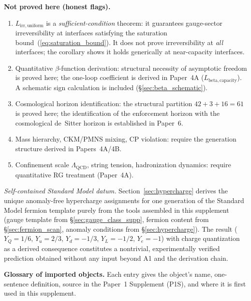 \documentclass[11pt,a4paper]{article}
\theoremstyle{definition}
\begin{document}
\begin{tcolorbox}[apfbox, title={What Is Assumed, What Is Proved, What Is Deferred}]
\smallskip\noindent\textbf{Not proved here (honest flags).}
\begin{enumerate}[nosep,label=\arabic*.,leftmargin=2em]
  \item $L_{\mathrm{irr,uniform}}$ is a \emph{sufficient-condition} theorem: it guarantees gauge-sector irreversibility at interfaces satisfying the saturation bound~(\ref{eq:saturation_bound}).  It does not prove irreversibility at \emph{all} interfaces; the corollary shows it holds generically at near-capacity interfaces.
  \item Quantitative $\beta$-function derivation: structural necessity of asymptotic freedom is proved here; the one-loop coefficient is derived in Paper~4A ($L_{\mathrm{beta,capacity}}$).  A schematic sign calculation is included (\S\ref{sec:beta_schematic}).
  \item Cosmological horizon identification: the structural partition $42+3+16=61$ is proved here; the identification of the enforcement horizon with the cosmological de~Sitter horizon is established in Paper~6.
  \item Mass hierarchy, CKM/PMNS mixing, CP violation: require the generation structure derived in Papers~4A/4B.
  \item Confinement scale $\Lambda_{\mathrm{QCD}}$, string tension, hadronization dynamics: require quantitative RG treatment (Paper~4A).
\end{enumerate}
\end{tcolorbox}

\smallskip\noindent\textit{Self-contained Standard Model datum.}\quad
Section~\ref{sec:hypercharge} derives the unique anomaly-free hypercharge
assignments for one generation of the Standard Model fermion template
purely from the tools assembled in this supplement (gauge template from
\S\ref{sec:gauge_class_supp}, fermion content from \S\ref{sec:fermion_scan},
anomaly conditions from \S\ref{sec:hypercharge}).  The result
($Y_Q = 1/6$, $Y_u = 2/3$, $Y_d = -1/3$, $Y_L = -1/2$, $Y_e = -1$)
with charge quantization as a derived consequence constitutes a
nontrivial, experimentally verified prediction obtained without any
input beyond A1 and the derivation chain.

\medskip\noindent\textbf{Glossary of imported objects.}  Each entry gives the object's name, one-sentence definition, source in the Paper~1 Supplement (P1S), and where it is first used in this supplement.
\end{document}
